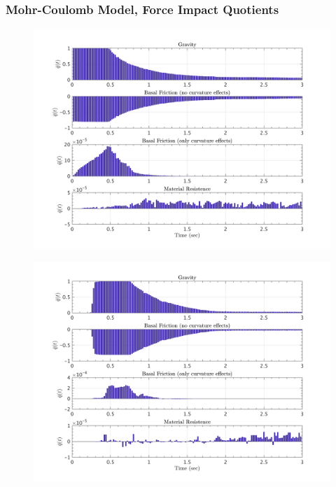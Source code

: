 \documentclass{article}
\begin{document}
\subsubsection{Mohr-Coulomb Model, Force Impact Quotients}
\begin{figure}[H]
        \begin{minipage}[b]{0.5\linewidth}
                \centering
                \includegraphics[width=1\textwidth]{InclinedPlane/LocalRecords/ContribF1_C_x.png}
                \label{fig:Ramp-Cx1}
        \end{minipage}
        \begin{minipage}[b]{0.5\linewidth}
                \centering
                \includegraphics[width=1\textwidth]{InclinedPlane/LocalRecords/ContribF8_C_x.png}
                \label{fig:Ramp-Cx2}
        \end{minipage}


\end{figure}
\end{document}
